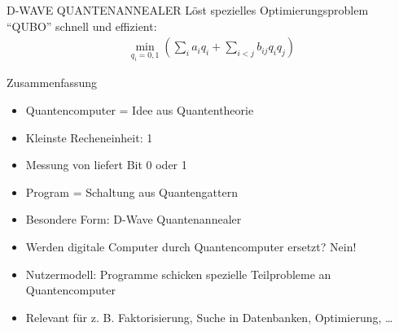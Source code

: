 \begin{defi}[Quantencomputer]{D-WAVE QUANTENANNEALER}
    Löst spezielles Optimierungsproblem \enquote{QUBO} schnell und effizient:
    \begin{align*}
        \min\limits_{q_i = 0,1}\left(\sum\limits_i a_i q_i + \sum\limits_{i<j} b_{ij} q_i q_j\right)
    \end{align*}
\end{defi}

\begin{bonus}[Quantencomputer]{Zusammenfassung}
    \begin{itemize}
        \item Quantencomputer = Idee aus Quantentheorie
        \item Kleinste Recheneinheit: 1 
        \item Messung von  liefert Bit 0 oder 1
        \item Program = Schaltung aus Quantengattern
        \item Besondere Form: D-Wave Quantenannealer
        \item Werden digitale Computer durch Quantencomputer ersetzt? Nein!
        \item Nutzermodell: Programme schicken spezielle Teilprobleme an Quantencomputer
        \item Relevant für z. B. Faktorisierung, Suche in Datenbanken, Optimierung, \ldots
    \end{itemize}
\end{bonus}

